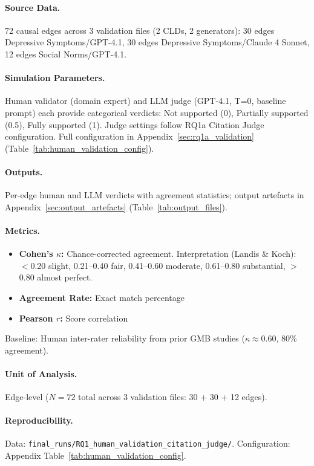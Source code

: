 \paragraph{Source Data.}
72 causal edges across 3 validation files (2 CLDs, 2 generators): 30 edges Depressive Symptoms/GPT-4.1, 30 edges Depressive Symptoms/Claude 4 Sonnet, 12 edges Social Norms/GPT-4.1.

\paragraph{Simulation Parameters.}
Human validator (domain expert) and LLM judge (GPT-4.1, T=0, baseline prompt) each provide categorical verdicts: Not supported (0), Partially supported (0.5), Fully supported (1). Judge settings follow RQ1a Citation Judge configuration. Full configuration in Appendix~\ref{sec:rq1a_validation} (Table~\ref{tab:human_validation_config}).

\paragraph{Outputs.}
Per-edge human and LLM verdicts with agreement statistics; output artefacts in Appendix~\ref{sec:output_artefacts} (Table~\ref{tab:output_files}).

\paragraph{Metrics.}
\begin{itemize}[noitemsep]
    \item \textbf{Cohen's $\kappa$:} Chance-corrected agreement. Interpretation (Landis \& Koch): $<$0.20 slight, 0.21--0.40 fair, 0.41--0.60 moderate, 0.61--0.80 substantial, $>$0.80 almost perfect.
    \item \textbf{Agreement Rate:} Exact match percentage
    \item \textbf{Pearson $r$:} Score correlation
\end{itemize}
Baseline: Human inter-rater reliability from prior GMB studies ($\kappa \approx 0.60$, 80\% agreement).

\paragraph{Unit of Analysis.}
Edge-level ($N=72$ total across 3 validation files: 30 + 30 + 12 edges).

\paragraph{Reproducibility.}
Data: \texttt{final\_runs/RQ1\_human\_validation\_citation\_judge/}. Configuration: Appendix Table~\ref{tab:human_validation_config}.

